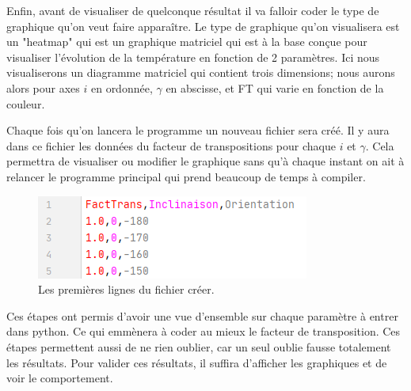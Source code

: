 \documentclass[12pt,a4paper,openright]{report}
\begin{document}
Enfin, avant de visualiser de quelconque résultat il va falloir coder le type de graphique qu'on veut faire apparaître. Le type de graphique qu'on visualisera est un "heatmap" qui est un graphique matriciel qui est à la base conçue pour visualiser l'évolution de la température en fonction de 2 paramètres. Ici nous visualiserons un diagramme matriciel qui contient trois dimensions; nous aurons alors pour axes $i$ en ordonnée, $\gamma$ en abscisse, et FT qui varie en fonction de la couleur.

Chaque fois qu'on lancera le programme un nouveau fichier sera créé. Il y aura dans ce fichier les données du facteur de transpositions pour chaque $i$ et $\gamma$. Cela permettra de visualiser ou modifier le graphique sans qu'à chaque instant on ait à relancer le programme principal qui prend beaucoup de temps à compiler.

\begin{figure}[h!]
\begin{center}
\includegraphics[scale=0.6]{dataFT}
\caption{Les premières lignes du fichier créer.}
\end{center}
\end{figure}

Ces étapes ont permis d'avoir une vue d'ensemble sur chaque paramètre à entrer dans python. Ce qui emmènera à coder au mieux le facteur de transposition. Ces étapes permettent aussi de ne rien oublier, car un seul oublie fausse totalement les résultats. Pour valider ces résultats, il suffira d'afficher les graphiques et de voir le comportement. 



\newpage
\end{document}
